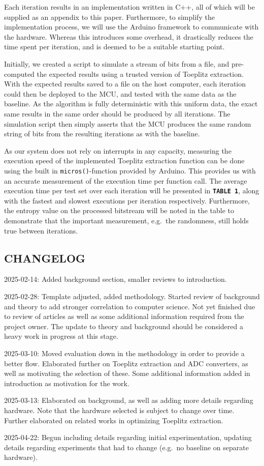Each iteration results in an implementation written in C++, all of which will be supplied as an appendix to this paper. Furthermore, to simplify the implementation process, we will use the Arduino framework to communicate with the hardware. Whereas this introduces some overhead, it drastically reduces the time spent per iteration, and is deemed to be a suitable starting point.

Initially, we created a script to simulate a stream of bits from a file, and pre-computed the expected results using a trusted version of Toeplitz extraction. With the expected results saved to a file on the host computer, each iteration could then be deployed to the MCU, and tested with the same data as the baseline. As the algorithm is fully deterministic with this uniform data, the exact same results in the same order should be produced by all iterations. The simulation script then simply asserts that the MCU produces the same random string of bits from the resulting iterations as with the baseline.

As our system does not rely on interrupts in any capacity, measuring the execution speed of the implemented Toeplitz extraction function can be done using the built in \texttt{micros()}-function provided by Arduino. This provides us with an accurate measurement of the execution time per function call. The average execution time per test set over each iteration will be presented in \textbf{\texttt{TABLE\ 1}}, along with the fastest and slowest executions per iteration respectively. Furthermore, the entropy value on the processed bitstream will be noted in the table to demonstrate that the important measurement, e.g.~the randomness, still holds true between iterations.

\newpage

\subsection{CHANGELOG}\label{changelog}

2025-02-14: Added background section, smaller reviews to introduction.

2025-02-28: Template adjusted, added methodology. Started review of background and theory to add stronger correlation to computer science. Not yet finished due to review of articles as well as some additional information required from the project owner. The update to theory and background should be considered a heavy work in progress at this stage.

2025-03-10: Moved evaluation down in the methodology in order to provide a better flow. Elaborated further on Toeplitz extraction and ADC converters, as well as motivating the selection of these. Some additional information added in introduction as motivation for the work.

2025-03-13: Elaborated on background, as well as adding more details regarding hardware. Note that the hardware selected is subject to change over time. Further elaborated on related works in optimizing Toeplitz extraction.

2025-04-22: Begun including details regarding initial experimentation, updating details regarding experiments that had to change (e.g.~no baseline on separate hardware).
